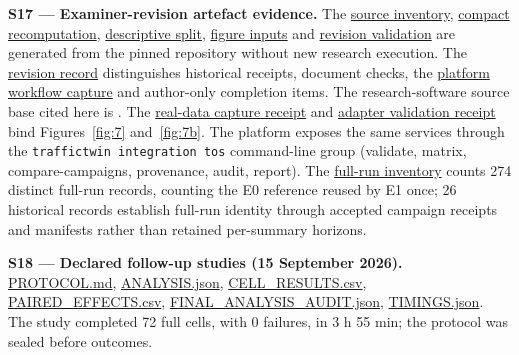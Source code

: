 \documentclass[12pt,a4paper]{article}
\begin{document}
\textbf{S17 --- Examiner-revision artefact evidence.} The \href{\detokenize{evidence/ARTEFACT_INVENTORY.json}}{source inventory}, \href{\detokenize{evidence/COMPACT_CHECKS.json}}{compact recomputation}, \href{\detokenize{evidence/DESCRIPTIVE_SPLIT.json}}{descriptive split}, \href{\detokenize{evidence/RSU_LAYOUT.json}}{figure inputs} and \href{\detokenize{document/REVISION_VALIDATION.json}}{revision validation} are generated from the pinned repository without new research execution. The \href{\detokenize{README.md}}{revision record} distinguishes historical receipts, document checks, the \href{\detokenize{evidence/PLATFORM_RESULTS_CAPTURE.json}}{platform workflow capture} and author-only completion items. The research-software source base cited here is . The \href{\detokenize{evidence/FINAL_PLATFORM_CAPTURE_2026-09-16.json}}{real-data capture receipt} and \href{\detokenize{evidence/TOS_ADAPTER_VALIDATION_2026-09-16.json}}{adapter validation receipt} bind Figures~\ref{fig:7} and~\ref{fig:7b}. The platform exposes the same services through the \texttt{traffictwin integration tos} command-line group (validate, matrix, compare-campaigns, provenance, audit, report). The \href{\detokenize{evidence/FINAL_FULL_RUN_COUNT_2026-09-16.json}}{full-run inventory} counts 274 distinct full-run records, counting the E0 reference reused by E1 once; 26 historical records establish full-run identity through accepted campaign receipts and manifests rather than retained per-summary horizons.

\label{source-s18}

\textbf{S18 --- Declared follow-up studies (15 September 2026).} \href{\detokenize{https://github.com/Abdulla4akash/traffictwin/blob/fe8c8d9e4f725665508e47e61dc6e3286d005450/docs/dissertation/followups_2026-09-15/PROTOCOL.md}}{PROTOCOL.md}, \href{\detokenize{https://github.com/Abdulla4akash/traffictwin/blob/fe8c8d9e4f725665508e47e61dc6e3286d005450/docs/dissertation/followups_2026-09-15/ANALYSIS.json}}{ANALYSIS.json}, \href{\detokenize{https://github.com/Abdulla4akash/traffictwin/blob/fe8c8d9e4f725665508e47e61dc6e3286d005450/docs/dissertation/followups_2026-09-15/CELL_RESULTS.csv}}{CELL\_\allowbreak{}RESULTS.csv}, \href{\detokenize{https://github.com/Abdulla4akash/traffictwin/blob/fe8c8d9e4f725665508e47e61dc6e3286d005450/docs/dissertation/followups_2026-09-15/PAIRED_EFFECTS.csv}}{PAIRED\_\allowbreak{}EFFECTS.csv}, \href{\detokenize{https://github.com/Abdulla4akash/traffictwin/blob/fe8c8d9e4f725665508e47e61dc6e3286d005450/docs/dissertation/followups_2026-09-15/evidence/FINAL_ANALYSIS_AUDIT.json}}{FINAL\_\allowbreak{}ANALYSIS\_\allowbreak{}AUDIT.json}, \href{\detokenize{https://github.com/Abdulla4akash/traffictwin/blob/fe8c8d9e4f725665508e47e61dc6e3286d005450/docs/dissertation/followups_2026-09-15/evidence/TIMINGS.json}}{TIMINGS.json}. The study completed 72 full cells, with 0 failures, in 3 h 55 min; the protocol was sealed before outcomes.
\end{document}
